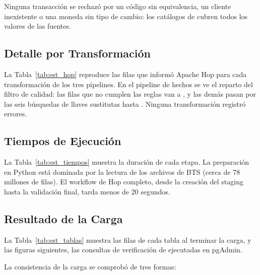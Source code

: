 Ninguna transacción se rechazó por un código sin equivalencia, un cliente
inexistente o una moneda sin tipo de cambio: los catálogos de
 cubren todos los valores de las fuentes.

\subsection{Detalle por Transformación}

La Tabla~\ref{tab:est_hop} reproduce las filas que informó Apache Hop para cada
transformación de los tres pipelines. En el pipeline de hechos se ve el
reparto del filtro de calidad: las filas que no cumplen las reglas van a
, y las demás pasan por las seis búsquedas de llaves
sustitutas hasta . Ninguna transformación registró
errores.



\subsection{Tiempos de Ejecución}

La Tabla~\ref{tab:est_tiempos} muestra la duración de cada etapa. La
preparación en Python está dominada por la lectura de los archivos de BTS
(cerca de 78 millones de filas). El workflow de Hop completo, desde la creación
del staging hasta la validación final, tarda menos de 20 segundos.



\subsection{Resultado de la Carga}

La Tabla~\ref{tab:est_tablas} muestra las filas de cada tabla al terminar la
carga, y las figuras siguientes, las consultas de verificación de
 ejecutadas en pgAdmin.



La consistencia de la carga se comprobó de tres formas:

